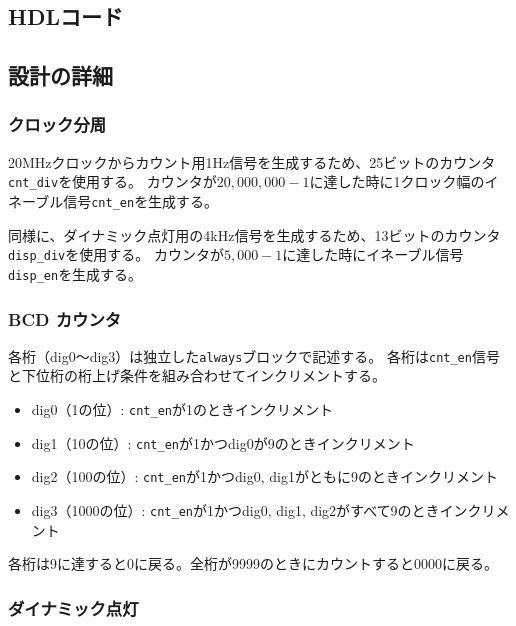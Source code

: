 \documentclass[a4paper,11pt]{ltjsarticle}
\begin{document}
\subsection{HDLコード}



\subsection{設計の詳細}

\subsubsection{クロック分周}

20MHzクロックからカウント用1Hz信号を生成するため、25ビットのカウンタ\texttt{cnt\_div}を使用する。
カウンタが$20{,}000{,}000 - 1$に達した時に1クロック幅のイネーブル信号\texttt{cnt\_en}を生成する。

同様に、ダイナミック点灯用の4kHz信号を生成するため、13ビットのカウンタ\texttt{disp\_div}を使用する。
カウンタが$5{,}000 - 1$に達した時にイネーブル信号\texttt{disp\_en}を生成する。

\subsubsection{BCD カウンタ}

各桁（dig0〜dig3）は独立した\texttt{always}ブロックで記述する。
各桁は\texttt{cnt\_en}信号と下位桁の桁上げ条件を組み合わせてインクリメントする。

\begin{itemize}
\item dig0（1の位）: \texttt{cnt\_en}が1のときインクリメント
\item dig1（10の位）: \texttt{cnt\_en}が1かつdig0が9のときインクリメント
\item dig2（100の位）: \texttt{cnt\_en}が1かつdig0, dig1がともに9のときインクリメント
\item dig3（1000の位）: \texttt{cnt\_en}が1かつdig0, dig1, dig2がすべて9のときインクリメント
\end{itemize}

各桁は9に達すると0に戻る。全桁が9999のときにカウントすると0000に戻る。

\subsubsection{ダイナミック点灯}
\end{document}
